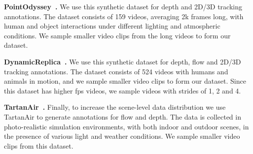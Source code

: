 \noindent
\textbf{PointOdyssey~\cite{zheng2023pointodyssey}.}
We use this synthetic dataset for depth and 2D/3D tracking annotations.
The dataset consists of 159 videos, averaging 2k frames long, with human and object interactions under different lighting and atmospheric conditions.
We sample smaller video clips from the long videos to form our dataset.

\noindent
\textbf{DynamicReplica~\cite{karaev2023dynamicstereo}.}
We use this synthetic dataset for depth, flow and 2D/3D tracking annotations.
The dataset consists of 524 videos with humans and animals in motion, and we sample smaller video clips to form our dataset.
Since this dataset has higher fps videos, we sample videos with strides of 1, 2 and 4.

\noindent
\textbf{TartanAir~\cite{tartanair2020iros}.}
Finally, to increase the scene-level data distribution we use TartanAir to generate annotations for flow and depth.
The data is collected in photo-realistic simulation environments, with both indoor and outdoor scenes, in the presence of various light and weather conditions.
We sample smaller video clips from this dataset.


\begin{table}
    \centering
    \caption{\textbf{Inference time.} 
    We compare our per-frame inference time with several task-specific approaches and show at least comparable speed-wise to methods specialized for each task. 
    SpaTracker inference time is measured without the depth estimation.}
    \label{tab:inferencetime}
\end{table} 



